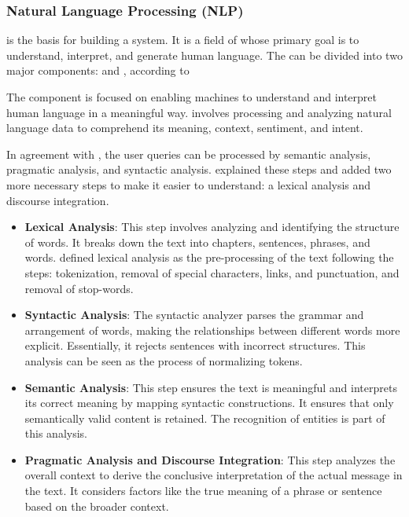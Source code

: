 \subsubsection{Natural Language Processing (NLP)}

{\nlp} is the basis for building a {\qa} system. It is a field of {\ai} whose primary goal is to understand, interpret, and generate human language. The {\nlp} can be divided into two major components: {\nlu} and {\nlg}, according to \citet{ayanouz_smart_2020}

The \textbf{ {\nlu} } component is focused on enabling machines to understand and interpret human language in a meaningful way. {\nlu} involves processing and analyzing natural language data to comprehend its meaning, context, sentiment, and intent. 

In agreement with \citet{ngai_intelligent_2021}, the user queries can be processed by semantic analysis, pragmatic analysis, and syntactic analysis. \citet{ayanouz_smart_2020} explained these steps and added two more necessary steps to make it easier to understand: a lexical analysis and discourse integration.

\begin{itemize}
    \item \textbf{Lexical Analysis}: This step involves analyzing and identifying the structure of words. It breaks down the text into chapters, sentences, phrases, and words. \citet{chizhik_challenges_2020} defined lexical analysis as the pre-processing of the text following the steps: tokenization, removal of special characters, links, and punctuation, and removal of stop-words.

    \item \textbf{Syntactic Analysis}: The syntactic analyzer parses the grammar and arrangement of words, making the relationships between different words more explicit. Essentially, it rejects sentences with incorrect structures. This analysis can be seen as the process of normalizing tokens.

    \item \textbf{Semantic Analysis}: This step ensures the text is meaningful and interprets its correct meaning by mapping syntactic constructions. It ensures that only semantically valid content is retained. The recognition of entities is part of this analysis.

    \item \textbf{Pragmatic Analysis and Discourse Integration}: This step analyzes the overall context to derive the conclusive interpretation of the actual message in the text. It considers factors like the true meaning of a phrase or sentence based on the broader context.
\end{itemize}

